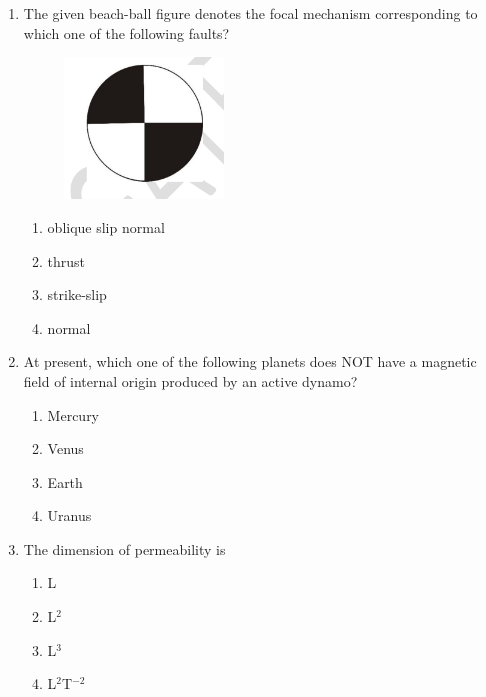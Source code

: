 \documentclass[journal,12pt,onecolumn]{IEEEtran}
\begin{document}
\begin{enumerate}
\item The given beach-ball figure denotes the focal mechanism corresponding to which one of the following faults?  
\begin{figure}[h!]
    \centering
    \includegraphics[width=0.4\textwidth]{figs/fig10.png}
    \caption{}
    \label{fig:q18}
\end{figure}


\hfill{}

\begin{multicols}{2}
\begin{enumerate}
\item oblique slip normal
\item thrust
\item strike-slip
\item normal
\end{enumerate}
\end{multicols}

\item At present, which one of the following planets does NOT have a magnetic field of internal origin produced by an active dynamo?  

\hfill{}

\begin{multicols}{2}
\begin{enumerate}
\item Mercury
\item Venus
\item Earth
\item Uranus
\end{enumerate}
\end{multicols}

\item The dimension of permeability is  

\hfill{}

\begin{multicols}{2}
\begin{enumerate}
\item L
\item L$^2$
\item L$^3$
\item L$^2$T$^{-2}$
\end{enumerate}
\end{multicols}


\end{enumerate}
\end{document}
